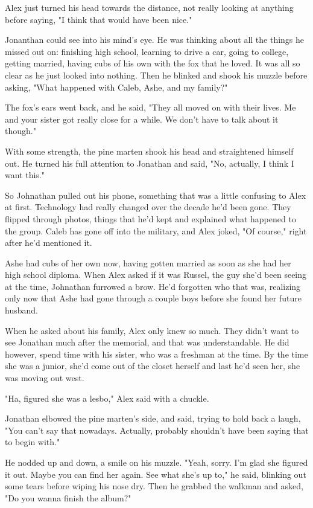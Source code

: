 Alex just turned his head towards the distance, not really looking at anything before saying, "I think that would have been nice."

Jonanthan could see into his mind's eye. He was thinking about all the things he missed out on: finishing high school, learning to drive a car, going to college, getting married, having cubs of his own with the fox that he loved. It was all so clear as he just looked into nothing. Then he blinked and shook his muzzle before asking, "What happened with Caleb, Ashe, and my family?"

The fox's ears went back, and he said, "They all moved on with their lives. Me and your sister got really close for a while. We don't have to talk about it though."

With some strength, the pine marten shook his head and straightened himself out. He turned his full attention to Jonathan and said, "No, actually, I think I want this."

So Johnathan pulled out his phone, something that was a little confusing to Alex at first. Technology had really changed over the decade he'd been gone. They flipped through photos, things that he'd kept and explained what happened to the group. Caleb has gone off into the military, and Alex joked, "Of course," right after he'd mentioned it.

Ashe had cubs of her own now, having gotten married as soon as she had her high school diploma. When Alex asked if it was Russel, the guy she'd been seeing at the time, Johnathan furrowed a brow. He'd forgotten who that was, realizing only now that Ashe had gone through a couple boys before she found her future husband.

When he asked about his family, Alex only knew so much. They didn't want to see Jonathan much after the memorial, and that was understandable. He did however, spend time with his sister, who was a freshman at the time. By the time she was a junior, she'd come out of the closet herself and last he'd seen her, she was moving out west.

"Ha, figured she was a lesbo," Alex said with a chuckle.

Jonathan elbowed the pine marten's side, and said, trying to hold back a laugh, "You can't say that nowadays. Actually, probably shouldn't have been saying that to begin with."

He nodded up and down, a smile on his muzzle. "Yeah, sorry. I'm glad she figured it out. Maybe you can find her again. See what she's up to," he said, blinking out some tears before wiping his nose dry. Then he grabbed the walkman and asked, "Do you wanna finish the album?"

